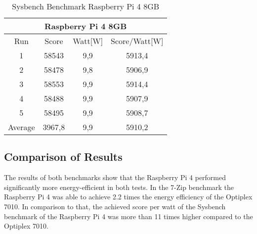 \begin{table}[h]
\centering
\caption{Sysbench Benchmark Raspberry Pi 4 8GB}
\label{tab:sysbenchBenchmarkRaspberryPi}
\begin{tabular}{c c c c}
\hline
 \multicolumn{4}{|c|}{Raspberry Pi 4 8GB} \\            \hline
Run & Score & Watt[W] & Score/Watt[W]\\                    \hline
1 & 58543 & 9,9 &  5913,4\\    
2 & 58478 & 9,8 &  5906,9\\       
3 & 58553 & 9,9 &  5914,4\\       
4 & 58488 & 9,9 &  5907,9\\    
5 & 58495 & 9,9 &  5908,7\\                             \hline
Average & 3967,8 & 9,9 & 5910,2\\                       \hline
\end{tabular}
\end{table}


\subsection{Comparison of Results}
The results of both benchmarks show that the Raspberry Pi 4 performed significantly more energy-efficient in both tests. 
In the 7-Zip benchmark the Raspberry Pi 4 was able to achieve 2.2 times the energy efficiency of the Optiplex 7010. 
In comparison to that, the achieved score per watt of the Sysbench benchmark of the Raspberry Pi 4 was more than 11 times higher 
compared to the Optiplex 7010. 
\phantom{x}

